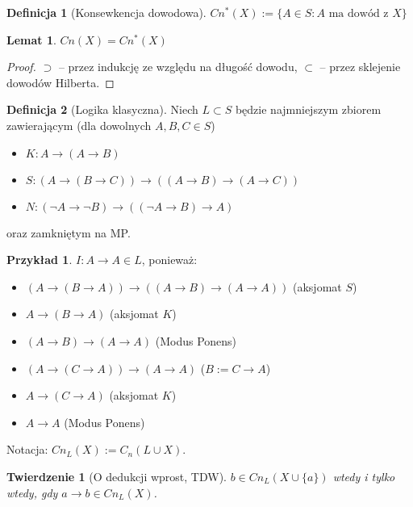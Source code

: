 \documentclass[10pt,a4paper]{article}
\theoremstyle{plain}
\newtheorem{theorem}{Twierdzenie}
\newtheorem{lemma}{Lemat}
\theoremstyle{definition}
\newtheorem*{definition}{Definicja}
\newtheorem*{example}{Przykład}
\newcommand{\impl}{\rightarrow}
\begin{document}

\begin{definition}[Konsewkencja dowodowa]
$Cn^*(X) := \{ A \in S: A \text{ ma dowód z } X\}$
\end{definition}

\begin{lemma}
$Cn(X) = Cn^*(X)$
\end{lemma}

\begin{proof}
$\supset$ -- przez indukcję ze względu na długość dowodu,
$\subset$ -- przez sklejenie dowodów Hilberta.
\end{proof}

\bigskip

\begin{definition}[Logika klasyczna]
Niech $L \subset S$ będzie najmniejszym zbiorem zawierającym (dla dowolnych
$A, B, C \in S$)
\begin{itemize}
  \item $K: A \impl (A \impl B)$
  \item $S: (A \impl (B \impl C)) \impl ((A \impl B) \impl (A \impl C))$
  \item $N: (\neg A \impl \neg B) \impl ((\neg A \impl B) \impl A)$
\end{itemize}
oraz zamkniętym na MP.
\end{definition}

\begin{example}
$I: A \impl A \in L$, ponieważ:
\begin{itemize}
  \item $(A \impl (B \impl A)) \impl ((A \impl B) \impl (A \impl A))$
    \quad(aksjomat $S$)
  \item $A \impl (B \impl A)$ \quad(aksjomat $K$)
  \item $(A \impl B) \impl (A \impl A)$ \quad(Modus Ponens)
  \item $(A \impl (C \impl A)) \impl (A \impl A)$ \quad($B := C \impl A$)
  \item $A \impl (C \impl A)$ \quad(aksjomat $K$)
  \item $A \impl A$ \quad(Modus Ponens)
\end{itemize}
\end{example}

\noindent Notacja: $Cn_L(X) := C_n(L \cup X)$.

\begin{theorem}[O dedukcji wprost, TDW]
$b \in Cn_L(X \cup \{a\})$ wtedy i tylko wtedy, gdy $a \impl b \in Cn_L(X)$.
\end{theorem}
\end{document}
